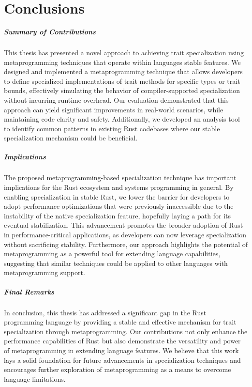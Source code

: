 \chapter{Conclusions}\label{chap:conclusions}

\paragraph{Summary of Contributions}
This thesis has presented a novel approach to achieving trait specialization using metaprogramming techniques that operate within languages stable features.
We designed and implemented a metaprogramming technique that allows developers to define specialized implementations of trait methods for specific types or trait bounds, effectively simulating the behavior of compiler-supported specialization without incurring runtime overhead.
Our evaluation demonstrated that this approach can yield significant improvements in real-world scenarios, while maintaining code clarity and safety.
Additionally, we developed an analysis tool to identify common patterns in existing Rust codebases where our stable specialization mechanism could be beneficial.

\paragraph{Implications}
The proposed metaprogramming-based specialization technique has important implications for the Rust ecosystem and systems programming in general.
By enabling specialization in stable Rust, we lower the barrier for developers to adopt performance optimizations that were previously inaccessible due to the instability of the native specialization feature, hopefully laying a path for its eventual stabilization.
This advancement promotes the broader adoption of Rust in performance-critical applications, as developers can now leverage specialization without sacrificing stability.
Furthermore, our approach highlights the potential of metaprogramming as a powerful tool for extending language capabilities, suggesting that similar techniques could be applied to other languages with metaprogramming support.

\paragraph{Final Remarks}
In conclusion, this thesis has addressed a significant gap in the Rust programming language by providing a stable and effective mechanism for trait specialization through metaprogramming.
Our contributions not only enhance the performance capabilities of Rust but also demonstrate the versatility and power of metaprogramming in extending language features.
We believe that this work lays a solid foundation for future advancements in specialization techniques and encourages further exploration of metaprogramming as a means to overcome language limitations.